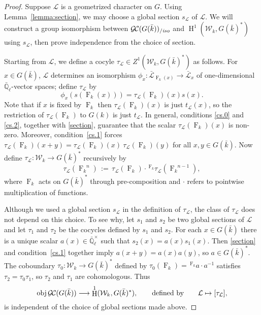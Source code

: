 \documentclass[11pt]{amsart}
\theoremstyle{plain}
\theoremstyle{definition}
\theoremstyle{remark}
\newcommand{\EE}{\mathbb{\bar Q}_\ell}
\newcommand{\bFq}{\bar{k}}
\newcommand{\Fq}{k}
\newcommand{\EEx}{\EE^\times}
\newcommand{\Frob}[1]{{\operatorname{F}_{#1}}}
\DeclareMathOperator{\Hh}{H}
\newcommand{\ceq}{{\, :=\, }}
\newcommand{\obj}{{\text{obj}\, }}
\newcommand{\cs}[1]{{\mathcal{#1}}}
\newcommand{\gcs}[1]{{\mathcal{\bar #1}}}
\newcommand{\GC}{{\mathcal{G\hskip-0.8pt C}}}
\newcommand{\GCiso}[1]{\GC(#1)_{/\textit{iso}}}
\newcommand{\Weil}[1]{\mathcal{W}_{#1}}
\begin{document}
\begin{proof}
  Suppose $\cs{L}$ is a geometrized character on $G$.  Using Lemma~\ref{lemma:section}, we may choose a global section $s_{\cs{L}}$
  of $\cs{L}$.  We will construct a group isomorphism between $\GCiso{G(\bFq)}$ and
  $\Hh^1(\Weil{\Fq}, G(\bFq)^*)$ using $s_{\cs{L}}$, then prove independence from the choice of section.

  Starting from $\cs{L}$, we define a cocyle $\tau_{\cs{L}} \in Z^1(\Weil{\Fq},G(\bFq)^*)$ as follows.
  For $x \in G(\bFq)$, $\cs{L}$ determines an isomorphism $\phi_x : \gcs{L}_{\Frob{\Fq}(x)} \to \gcs{L}_x$
  of one-dimensional $\EE$-vector spaces; define $\tau_\cs{L}$ by
  \begin{equation}\label{t}
   \phi_{x}(s(\Frob{\Fq}(x))) = \tau_\cs{L}(\Frob{\Fq})(x) s(x).
  \end{equation}
  Note that if $x$ is fixed by $\Frob{k}$ then $\tau_\cs{L}(\Frob{\Fq})(x)$ is just $t_\cs{L}(x)$, so the restriction of
  $\tau_\cs{L}(\Frob{k})$ to $G(k)$ is just $t_\cs{L}$.
  In general, conditions \ref{cs.0} and \ref{cs.2}, together with \eqref{section}, guarantee that
  the scalar $\tau_\cs{L}(\Frob{k})(x)$ is non-zero.  Moreover, condition~\ref{cs.1} forces
  $\tau_\cs{L}(\Frob{\Fq})(x+y) = \tau_\cs{L}(\Frob{\Fq})(x) \ \tau_\cs{L}(\Frob{\Fq})(y)$
  for all $x,y \in G(\bFq)$.  Now define $\tau_\cs{L} : \Weil{\Fq} \to G(\bFq)^*$ recursively by
  \[
   \tau_\cs{L}(\Frob{\Fq}^n) \ceq \tau_\cs{L}(\Frob{\Fq})\cdot \,^\Frob{\Fq} \tau_\cs{L}(\Frob{\Fq}^{n-1}),
  \]
  where $\Frob{\Fq}$ acts on $G(\bFq)^*$ through pre-composition and $\cdot$ refers
  to pointwise multiplication of functions.

  Although we used a global section $s_\cs{L}$ in the definition of
  $\tau_\cs{L}$, the class of $\tau_\cs{L}$ does not depend on this
  choice. To see why, let $s_1$ and $s_2$ be two global sections of
  $\cs{L}$ and let $\tau_1$ and $\tau_2$ be the cocycles defined by $s_1$ and $s_2$.
  For each $x \in G(\bFq)$ there is a unique scalar
  $a(x) \in \EEx$ such that $s_2(x) = a(x) s_1(x)$. Then \eqref{section} and
  condition~\ref{cs.1} together imply $a(x+y) = a(x)a(y)$, so
  $a\in G(\bFq)^*$.  The coboundary $\tau_0 : \Weil{\Fq} \to G(\bFq)^*$
  defined by $\tau_0(\Frob{\Fq}) = \,^\Frob{\Fq} a \cdot a^{-1}$ satisfies $\tau_2 = \tau_0 \tau_1$,
  so $\tau_2$ and $\tau_1$ are cohomologous. Thus
  \begin{equation}\label{cohomologous}
    \obj \GC(G(\bFq)) \longrightarrow \Hh^1(\Weil{\Fq},G(\bFq)^*),
    \qquad \text{defined by} \qquad \cs{L} \mapsto [\tau_\cs{L}],
  \end{equation}
  is independent of the choice of global sections made above.


\end{proof}
\end{document}
